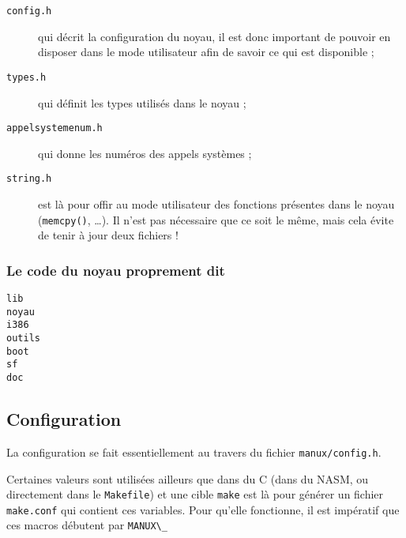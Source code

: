 \begin{description}
   \item[{\tt config.h}] qui décrit la configuration du noyau, il est
     donc important de pouvoir en disposer dans le mode utilisateur
     afin de savoir ce qui est disponible ;
   \item[{\tt types.h}] qui définit les types utilisés dans le noyau ;
   \item[{\tt appelsystemenum.h}] qui donne les numéros des appels
     systèmes ;
   \item[{\tt string.h}] est là pour offir au mode utilisateur des
     fonctions présentes dans le noyau ({\tt memcpy()}, \ldots). Il
     n'est pas nécessaire que ce soit le même, mais cela évite de
     tenir à jour deux fichiers !
\end{description}

%
\subsubsection{Le code du noyau proprement dit}


\begin{description}
   \item[{\tt lib}]
   \item[{\tt noyau}]
   \item[{\tt i386}]
   \item[{\tt outils}]
   \item[{\tt boot}]
   \item[{\tt sf}]
   \item[{\tt doc}]
\end{description}

%   
\subsection{Configuration}

   La configuration se fait essentiellement au travers du fichier {\tt manux/config.h}.

   Certaines valeurs sont utilisées ailleurs que dans du C (dans du NASM,
ou directement dans le {\tt Makefile}) et une cible  {\tt make} est là
pour générer un fichier {\tt make.conf} qui contient ces
variables. Pour qu'elle fonctionne, il est impératif que ces macros
débutent par \lstinline!MANUX\_!

